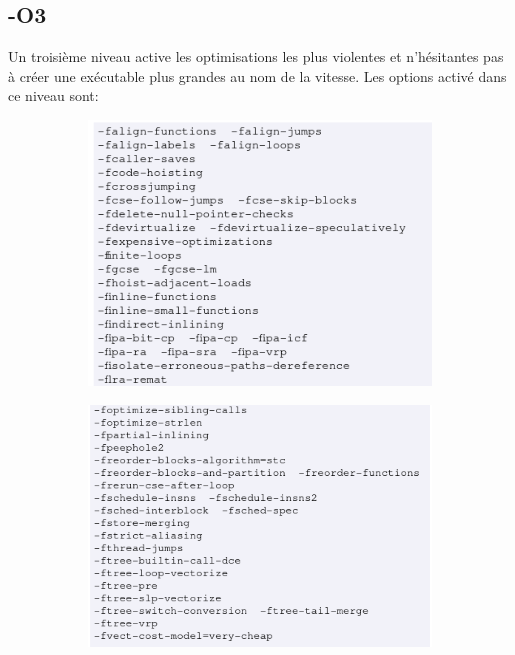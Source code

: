 \documentclass[11pt]{article} %
\begin{document}
\subsection*{-O3}

Un troisième niveau active les optimisations les plus violentes et n'hésitantes pas à créer une exécutable plus grandes au nom de la vitesse.
Les options activé dans ce niveau sont:
\newpage

\begin{figure}[h!]
    \centering
    \begin{subfigure}[h!]{0.49\textwidth}
        \includegraphics[height=.8\linewidth]{./media/O2top}
    \end{subfigure}
    \begin{subfigure}[h!]{0.49\textwidth}
        \includegraphics[height=.8\linewidth]{./media/O2bot}
    \end{subfigure}
\end{figure}
\end{document}
